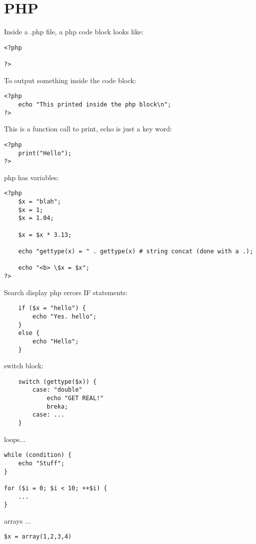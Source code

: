 \documentclass{report}
\begin{document}
\chapter{PHP}
Inside a .php file, a php code block looks like:
\begin{verbatim}
<?php

?>
\end{verbatim}
To output something inside the code block:
\begin{verbatim}
<?php
    echo "This printed inside the php block\n";
?>

\end{verbatim}
This is a function call to print, echo is just a key word:
\begin{verbatim}
<?php
    print("Hello");
?>

\end{verbatim}
php has variables:
\begin{verbatim}
<?php
    $x = "blah";
    $x = 1;
    $x = 1.04;

    $x = $x * 3.13;

    echo "gettype(x) = " . gettype(x) # string concat (done with a .);

    echo "<b> \$x = $x";
?>

\end{verbatim}
Search display php errors
\bigbreak \noindent
IF statements:
\begin{verbatim}
    if ($x = "hello") {
        echo "Yes. hello";
    }
    else {
        echo "Hello";
    }
\end{verbatim}
switch block:
\begin{verbatim}
    switch (gettype($x)) {
        case: "double"
            echo "GET REAL!"
            breka;
        case: ...
    }
\end{verbatim}
loops...
\begin{verbatim}
while (condition) {
    echo "Stuff";
}

for ($i = 0; $i < 10; ++$i) {
    ...
}
\end{verbatim}
arrays ...
\begin{verbatim}
$x = array(1,2,3,4)

\end{verbatim}
\end{document}
